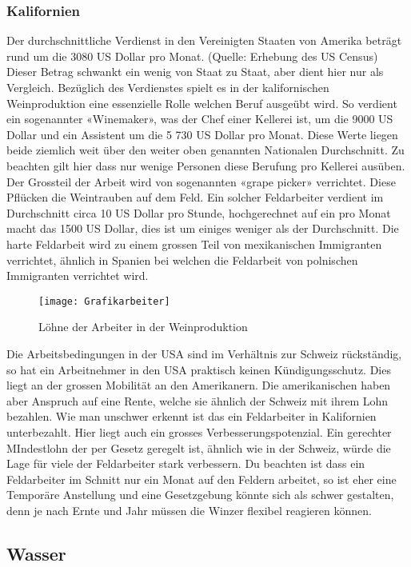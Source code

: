 \subsubsection{Kalifornien}

Der durchschnittliche Verdienst in den Vereinigten Staaten von Amerika beträgt rund um die 3080 US Dollar pro Monat. (Quelle: Erhebung des US Census) Dieser Betrag schwankt ein wenig von Staat zu Staat, aber dient hier nur als Vergleich. Bezüglich des Verdienstes spielt es in der kalifornischen Weinproduktion eine essenzielle Rolle welchen Beruf ausgeübt wird. So verdient ein sogenannter «Winemaker», was der Chef einer Kellerei ist, um die 9000 US
Dollar und ein Assistent um die 5 730 US Dollar pro Monat. Diese Werte liegen beide ziemlich weit über den weiter oben genannten Nationalen Durchschnitt. Zu beachten gilt hier dass nur wenige Personen diese Berufung pro Kellerei ausüben. Der Grossteil der Arbeit
wird von sogenannten «grape picker» verrichtet. Diese Pflücken die Weintrauben auf dem Feld. Ein solcher Feldarbeiter verdient im Durchschnitt circa 10 US Dollar pro Stunde,
\cite{_farm_????} hochgerechnet auf ein pro Monat macht das 1500 US Dollar, dies ist um einiges weniger als der Durchschnitt. Die harte Feldarbeit wird zu einem grossen Teil von mexikanischen Immigranten verrichtet, ähnlich in Spanien bei welchen die Feldarbeit von polnischen Immigranten verrichtet wird.
  \begin{figure}[H]
	\centering
	\texttt{[image: Grafikarbeiter]}
	\caption{Löhne der Arbeiter in der Weinproduktion}
\end{figure}
Die Arbeitsbedingungen in der USA sind im Verhältnis zur Schweiz rückständig, so hat ein Arbeitnehmer in den USA praktisch keinen Kündigungsschutz. Dies liegt an der grossen Mobilität an den Amerikanern. Die amerikanischen haben aber Anspruch auf eine Rente, welche sie ähnlich der Schweiz mit ihrem Lohn bezahlen. \cite{_arbeitszeiten_????} Wie man unschwer erkennt ist das ein Feldarbeiter in Kalifornien unterbezahlt. Hier liegt auch ein grosses Verbesserungspotenzial. Ein gerechter MIndestlohn der per Gesetz geregelt ist, ähnlich wie in der Schweiz, würde die Lage für viele der Feldarbeiter stark verbessern. Du beachten ist dass ein Feldarbeiter im Schnitt nur ein Monat auf den Feldern arbeitet, so ist eher eine Temporäre Anstellung und eine Gesetzgebung könnte sich als schwer gestalten, denn je nach Ernte und Jahr  müssen die Winzer flexibel reagieren können.


\subsection{Wasser}
